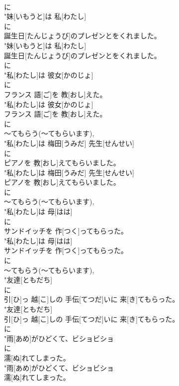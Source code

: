 \documentclass[8pt]{extreport}
\begin{document}
\begin{CJK}{UTF8}{min}
\\	に
\\	"妹[いもうと]は 私[わたし]
\\	に
\\	誕生日[たんじょうび]のプレゼンとをくれました。
\\	"妹[いもうと]は 私[わたし]
\\	誕生日[たんじょうび]のプレゼンとをくれました。
\\	に
\\	"私[わたし]は 彼女[かのじょ]
\\	に
\\	フランス 語[ご]を 教[おし]えた。
\\	"私[わたし]は 彼女[かのじょ]
\\	フランス 語[ご]を 教[おし]えた。
\\	に
\\	～てもらう(～てもらいます), 
\\	"私[わたし]は 梅田[うみだ] 先生[せんせい]
\\	に
\\	ピアノを 教[おし]えてもらいました。
\\	"私[わたし]は 梅田[うみだ] 先生[せんせい]
\\	ピアノを 教[おし]えてもらいました。
\\	に
\\	～てもらう(～てもらいます), 
\\	"私[わたし]は 母[はは]
\\	に
\\	サンドイッチを 作[つく]ってもらった。
\\	"私[わたし]は 母[はは]
\\	サンドイッチを 作[つく]ってもらった。
\\	に
\\	～てもらう(～てもらいます), 
\\	"友達[ともだち]
\\	に
\\	引[ひ]っ 越[こ]しの 手伝[てつだ]いに 来[き]てもらった。
\\	"友達[ともだち]
\\	引[ひ]っ 越[こ]しの 手伝[てつだ]いに 来[き]てもらった。
\\	に
\\	"雨[あめ]がひどくて、ビショビショ
\\	に
\\	濡[ぬ]れてしまった。
\\	"雨[あめ]がひどくて、ビショビショ
\\	濡[ぬ]れてしまった。

\end{CJK}
\end{document}
